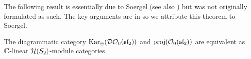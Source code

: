 


 The following result is essentially due to Soergel \cite[Endomorhihsmensatz 7, Struktursatz 9 and Section 2.4]{soergel-category-O} (see also \cite{soergel-combinatorics-of-hcbim}) but was not originally formulated as such. The key arguments are in \cite{soergel-category-O} so we attribute this theorem to Soergel.


\begin{theorem}
    The diagrammatic category $\operatorname{Kar_\oplus}(\mathcal{DO}_0(\operatorname{\mathfrak{sl}}_2))$ and $\operatorname{proj}(\mathcal{O}_0(\operatorname{\mathfrak{sl}}_2))$ are equivalent as $\mathbb{C}$-linear $\mathcal{H}(S_2)$-module categories.
\end{theorem}


